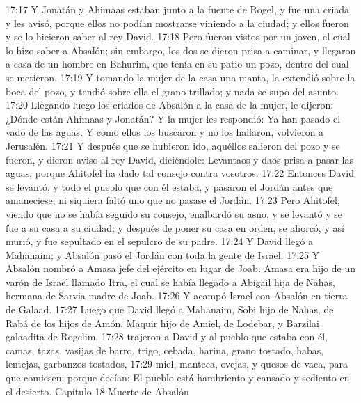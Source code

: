 17:17 Y Jonatán y Ahimaas estaban junto a la fuente de Rogel, y fue una criada y les avisó, porque ellos no podían mostrarse viniendo a la ciudad; y ellos fueron y se lo hicieron saber al rey David.  
17:18 Pero fueron vistos por un joven, el cual lo hizo saber a Absalón; sin embargo, los dos se dieron prisa a caminar, y llegaron a casa de un hombre en Bahurim, que tenía en su patio un pozo, dentro del cual se metieron.  
17:19 Y tomando la mujer de la casa una manta, la extendió sobre la boca del pozo, y tendió sobre ella el grano trillado; y nada se supo del asunto.  
17:20 Llegando luego los criados de Absalón a la casa de la mujer, le dijeron: ¿Dónde están Ahimaas y Jonatán? Y la mujer les respondió: Ya han pasado el vado de las aguas. Y como ellos los buscaron y no los hallaron, volvieron a Jerusalén.  
17:21 Y después que se hubieron ido, aquéllos salieron del pozo y se fueron, y dieron aviso al rey David, diciéndole: Levantaos y daos prisa a pasar las aguas, porque Ahitofel ha dado tal consejo contra vosotros.  
17:22 Entonces David se levantó, y todo el pueblo que con él estaba, y pasaron el Jordán antes que amaneciese; ni siquiera faltó uno que no pasase el Jordán.  
17:23 Pero Ahitofel, viendo que no se había seguido su consejo, enalbardó su asno, y se levantó y se fue a su casa a su ciudad; y después de poner su casa en orden, se ahorcó, y así murió, y fue sepultado en el sepulcro de su padre. 
17:24 Y David llegó a Mahanaim; y Absalón pasó el Jordán con toda la gente de Israel.  
17:25 Y Absalón nombró a Amasa jefe del ejército en lugar de Joab. Amasa era hijo de un varón de Israel llamado Itra, el cual se había llegado a Abigail hija de Nahas, hermana de Sarvia madre de Joab.  
17:26 Y acampó Israel con Absalón en tierra de Galaad.  
17:27 Luego que David llegó a Mahanaim, Sobi hijo de Nahas, de Rabá de los hijos de Amón, Maquir hijo de Amiel, de Lodebar, y Barzilai galaadita de Rogelim,  
17:28 trajeron a David y al pueblo que estaba con él, camas, tazas, vasijas de barro, trigo, cebada, harina, grano tostado, habas, lentejas, garbanzos tostados,  
17:29 miel, manteca, ovejas, y quesos de vaca, para que comiesen; porque decían: El pueblo está hambriento y cansado y sediento en el desierto.  
Capítulo 18
Muerte de Absalón  

